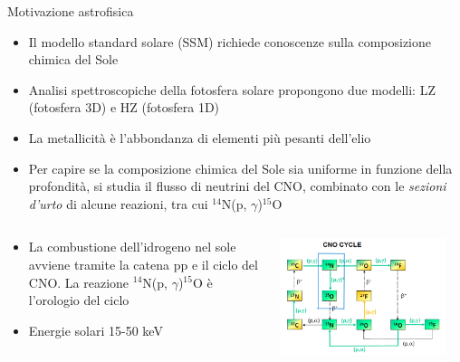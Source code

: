 \documentclass [xcolor=svgnames, 9pt] {beamer}
\begin{document}
\begin{frame}{Motivazione astrofisica}
	\begin{itemize}
		\item Il modello standard solare (SSM) richiede conoscenze sulla composizione chimica del Sole
		\item Analisi spettroscopiche della fotosfera solare propongono due modelli: LZ (fotosfera 3D) e HZ (fotosfera 1D)
		\item La metallicità è l'abbondanza di elementi più pesanti dell'elio
		\item Per capire se la composizione chimica del Sole sia uniforme in funzione della profondità, si studia il flusso di neutrini del CNO, combinato con le \emph{sezioni d'urto} di alcune reazioni, tra cui $^{14}$N(p, $\gamma$)$^{15}$O
	\end{itemize}
	
	\begin{columns}
		\begin{column}{0.35\textheight}
			\begin{itemize}
				\item La combustione dell'idrogeno nel sole avviene tramite la catena pp e il ciclo del CNO. La reazione $^{14}$N(p, $\gamma$)$^{15}$O è l'orologio del ciclo
				\item Energie solari 15-50 keV
			\end{itemize}
		\end{column}
		\begin{column}{0.65\textwidth}
			\centering
			\includegraphics[width=0.9\textwidth]{img/CNO_Cycle.png}
		\end{column}
	\end{columns}
\end{frame}
\end{document}

